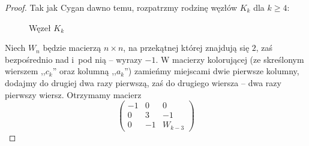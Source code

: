 \begin{proof}
    Tak jak Cygan dawno temu, rozpatrzmy rodzinę węzłów $K_k$ dla $k \ge 4$:
%

\begin{figure}[H]
    \centering
    \begin{comment}
    \begin{tikzpicture}[baseline=-0.65ex, scale=0.1]
    \begin{knot}[clip width=5, end tolerance=1pt, flip crossing/.list={1,2,3,6}]
        \strand[semithick] (-10, +3) .. controls (-4, +3) and (-4, -3) .. (0, -3);
        \strand[semithick] (-10, -3) .. controls (-4, -3) and (-4, +3) .. (0, +3);
        \node at (5, 0) {$\ldots$};
        \strand[semithick] (10+10, +3) .. controls (10+ 4, +3) and (10+ 4, -3) .. (10+0, -3);
        \strand[semithick] (10+ 10, -3) .. controls (10+ 4, -3) and (10+4, +3) .. (10+0, +3);
        \strand[semithick] (20+10, +3) .. controls (20+ 4, +3) and (20+ 4, -3) .. (20+0, -3);
    \strand[semithick] (20+ 10, -3) .. controls (20+ 4, -3) and (20+4, +3) .. (20+0, +3);
        \strand[semithick] (30, 3) [in=up, out=right] to (35, -3);
        \strand[semithick,  ] (30, -3) [in=down, out=right] to (35, 3);
        \strand[semithick] (35, 3) [in=right, out=up] to (0, 10);
        \strand[semithick] (35, -3) [in=right, out=down] to (0, -10);
        \strand[semithick] (-10, -3) [in=down, out=left] to (-20, 0) to [in=left, out=up] (-10, 3);
        \strand[semithick] (-15, 5) [in=left, out=up] to (0, 10);
        \strand[semithick] (-15, 5) to (-15, -5) [in=left, out=down] to (0, -10);
        \node at (-5, -5) {$c_3$};
        \node at (15, -5) {$c_{k-2}$};
        \node at (25, -5) {$c_{k-1}$};
    \end{knot}
    \end{tikzpicture}
\end{comment}
    \caption[caption-cygan]{Węzeł $K_k$}
\end{figure}

    Niech $W_n$ będzie macierzą $n \times n$, na przekątnej której znajdują się $2$, zaś bezpośrednio nad i~pod nią -- wyrazy $-1$.
    W macierzy kolorującej (ze skreślonym wierszem ,,$c_k$'' oraz kolumną ,,$a_k$'') zamieńmy miejscami dwie pierwsze kolumny, dodajmy do drugiej dwa razy pierwszą, zaś do drugiego wiersza -- dwa razy pierwszy wiersz.
    Otrzymamy macierz
    \begin{equation}
        \begin{pmatrix}
            -1 & 0 & 0 \\
            0 & 3 & -1 \\
            0 & -1 & W_{k-3}
        \end{pmatrix}
    \end{equation}


\end{proof}
